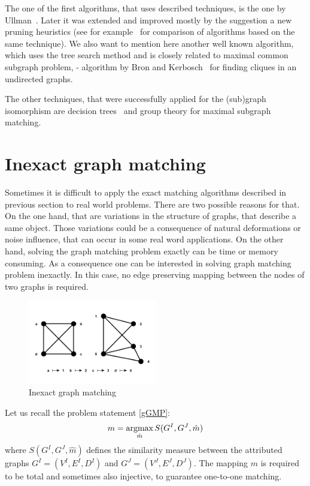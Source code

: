 The one of the first algorithms, that uses described techniques, is the one by Ullman~\cite{Ullmann}. Later it was extended and improved mostly by the suggestion a new pruning heuristics (see for example~\cite{Lee2013} for comparison of algorithms based on the same technique). We also want to mention here another well known algorithm, which uses the tree search method and is closely related to maximal common subgraph problem, - algorithm by Bron and Kerbosch~\cite{BronKerbosch} for finding cliques in an undirected graphs.

The other techniques, that were successfully applied for the (sub)graph isomorphism are decision trees~\cite{Messmer1999,Shearer1998,Shearer2001} and group theory\cite{McKay} for maximal subgraph matching. 

\section{Inexact graph matching}

Sometimes it is difficult to apply the exact matching algorithms described in previous section to real world problems. There are two possible reasons for that. On the one hand, that are variations in the structure of graphs, that describe a same object. Those variations could be a consequence of natural deformations or noise influence, that can occur in some real word applications. On the other hand, solving the graph matching problem exactly can be time or memory consuming. As a consequence one can be interested in solving graph matching problem inexactly. In this case, no edge preserving mapping between the nodes of two graphs is required.
\begin{figure}[htb]
	\centering
	\includegraphics[width=0.5\textwidth]{chapter1/fig/inexactGM}
    \caption{Inexact graph matching}
    \label{fig:inexact_GM}
\end{figure}

Let us recall the problem statement \eqref{gGMP}: 
\begin{equation*}
m = \mathop{\rm argmax}_{\hat{m}}S(G^I, G^J, \hat{m})
\end{equation*}
where $S(G^I, G^J, \hat{m})$ defines the similarity measure between the attributed graphs $G^I = (V^I, E^I,D^I)$ and $G^J = (V^J, E^J,D^J)$. The mapping $m$ is required to be total and sometimes also injective, to guarantee one-to-one matching.

